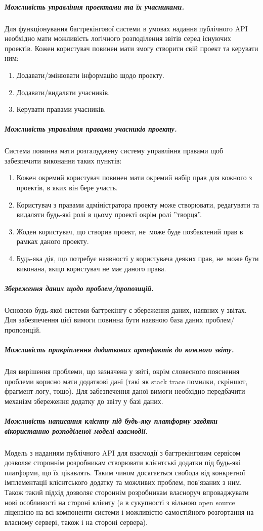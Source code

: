 \documentclass[../main.tex]{subfiles}
\begin{document}
	\subparagraph{Можливість управління проектами та їх учасниками.}
	Для функціонування багтрекінгової системи в умовах надання публічного API необхідно мати можливість логічного розподілення звітів серед існуючих проектів. Кожен користувач повинен мати змогу створити свій проект та керувати ним:
	\begin{enumerate}
		\item Додавати/змінювати інформацію щодо проекту.
		\item Додавати/видаляти учасників.
		\item Керувати правами учасників.
	\end{enumerate}
	
	\subparagraph{Можливість управління правами учасників проекту.}
	Система повинна мати розгалуджену систему управління правами щоб забезпечити виконання таких пунктів:
	\begin{enumerate}
		\item Кожен окремий користувач повинен мати окремий набір прав для кожного з проектів, в яких він бере участь.
		\item Користувач з правами адміністратора проекту може створювати, редагувати та видаляти будь-які ролі в цьому проекті окрім ролі ''творця''.
		\item Жоден користувач, що створив проект, не~може буде позбавлений прав в рамках даного проекту.
		\item Будь-яка дія, що потребує наявності у користувача деяких прав, не~може бути виконана, якщо користувач не має даного права.
	\end{enumerate}
	
	\subparagraph{Збереження даних щодо проблем/пропозицій.}
	Основою будь-якої системи багтрекінгу є збереження даних, наявних у звітах. Для забезпечення цієї вимоги повинна бути наявною база даних проблем/пропозицій.
	
	\subparagraph{Можливість прикріплення додаткових артефактів до кожного звіту.}
	Для вирішення проблеми, що зазначена у звіті, окрім словесного пояснення проблеми корисно мати додаткові дані (такі як stack trace помилки, скріншот, фрагмент логу, тощо). Для забезпечення даної вимоги необхідно передбачити механізм збереження додатку до звіту у базі даних.
	
	\subparagraph{Можливість написання клієнту під будь-яку платформу завдяки вікористанню розподіленої моделі взаємодії.}
	Модель з наданням публічного API для взаємодії з багтрекінговим сервісом дозволяє стороннім розробникам створювати клієнтські додатки під будь-які платформи, що їх цікавлять. Таким чином досягається свобода від конкретної імплементації клієнтського додатку та можливих проблем, пов'язаних з ним. Також такий підхід дозволяє стороннім розробникам власноруч впроваджувати нові особливості на стороні клієнту (а в сукупності з вільною open source ліцензією на всі компоненти системи і можливістю самостійного розгортання на власному сервері, також і на стороні сервера).
	
\end{document}
